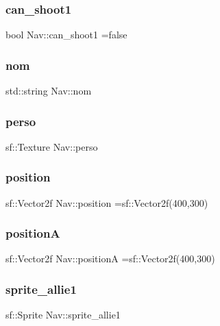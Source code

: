 \subsubsection{\texorpdfstring{can\+\_\+shoot1}{can\_shoot1}}
{\footnotesize\ttfamily bool Nav\+::can\+\_\+shoot1 =false}

\mbox{\label{class_nav_af809c7fbbdfdee3a6cfc2151f8fc1e41}} 
\subsubsection{\texorpdfstring{nom}{nom}}
{\footnotesize\ttfamily std\+::string Nav\+::nom}

\mbox{\label{class_nav_a546e6ebedbfb271ea7070cce2cfcaa7f}} 
\subsubsection{\texorpdfstring{perso}{perso}}
{\footnotesize\ttfamily sf\+::\+Texture Nav\+::perso}

\mbox{\label{class_nav_ae2c6a22f80dd0532d679a3ff921c8990}} 
\subsubsection{\texorpdfstring{position}{position}}
{\footnotesize\ttfamily sf\+::\+Vector2f Nav\+::position =sf\+::\+Vector2f(400,300)}

\mbox{\label{class_nav_a2507d20e69ae0ac8e929004a6dd737d3}} 
\subsubsection{\texorpdfstring{positionA}{positionA}}
{\footnotesize\ttfamily sf\+::\+Vector2f Nav\+::positionA =sf\+::\+Vector2f(400,300)}

\mbox{\label{class_nav_a7fd1b2f3e91bda41432ae8638eed802e}} 
\subsubsection{\texorpdfstring{sprite\+\_\+allie1}{sprite\_allie1}}
{\footnotesize\ttfamily sf\+::\+Sprite Nav\+::sprite\+\_\+allie1}

